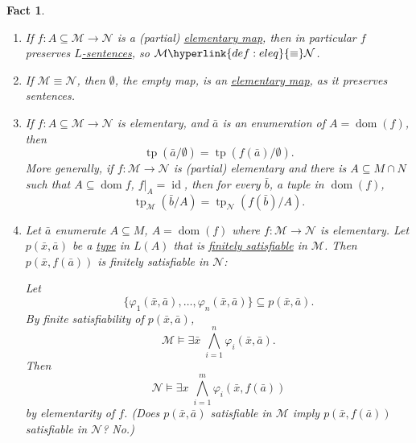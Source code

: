 \documentclass{article}
\let\models\vDash
\DeclareMathOperator{\dom}{dom}
\DeclareMathOperator{\tp}{tp}
\newtheorem{nfact}[nthm]{Fact}
\begin{document}
\begin{nfact}\label{fact:6.4}\leavevmode
  \begin{enumerate}[label=(\roman*)]
    \item If $f: A \subseteq \mathcal{M} \to \mathcal{N}$ is a (partial) \hyperlink{def:elmap}{elementary map}, then in particular $f$ preserves \hyperlink{def:sentence}{$L$-sentences}, so $\mathcal{M} \hyperlink{def:eleq}{\equiv} \mathcal{N}$.
    \item If $\mathcal{M} \equiv \mathcal{N}$, then $\emptyset$, the empty map, is an \hyperlink{def:el}{elementary map}, as it preserves sentences.
    \item If $f: A \subseteq \mathcal{M} \to \mathcal{N}$ is elementary, and $\bar{a}$ is an enumeration of $A = \dom(f)$, then
      \begin{equation*}
        \tp(\bar{a}/\emptyset) = \tp(f(\bar{a})/\emptyset).
      \end{equation*}
      More generally, if $f: \mathcal{M} \to \mathcal{N}$ is (partial) elementary and there is $A \subseteq M \cap N$ such that $A \subseteq \dom f$, $f|_A = \operatorname{id}$, then for every $\bar{b}$, a tuple in $\dom(f)$,
      \begin{equation*}
        \tp_\mathcal{M}(\bar{b}/A) = \tp_{\mathcal{N}}(f(\bar{b})/A).
      \end{equation*}
    \item Let $\bar{a}$ enumerate $A \subseteq M$, $A = \dom(f)$ where $f: \mathcal{M} \to \mathcal{N}$ is elementary.
      Let $p(\bar{x},\bar{a})$ be a \hyperlink{def:type}{type} in $L(A)$ that is \hyperlink{def:type}{finitely satisfiable} in $\mathcal{M}$.
      Then $p(\bar{x},f(\bar{a}))$ is finitely satisfiable in $\mathcal{N}$:

      Let
      \begin{equation*}\{\varphi_1(\bar{x},\bar{a}), \dotsc, \varphi_n(\bar{x},\bar{a})\} \subseteq p(\bar{x},\bar{a}).\end{equation*}
      By finite satisfiability of $p(\bar{x},\bar{a})$,
    \begin{equation*}\mathcal{M} \models \exists \bar{x} \; \bigwedge_{i=1}^n \varphi_i(\bar{x},\bar{a}).\end{equation*}
      Then
      \begin{equation*}\mathcal{N} \models \exists x \; \bigwedge_{i=1}^m \varphi_i(\bar{x},f(\bar{a}))\end{equation*}
      by elementarity of $f$.
      (Does $p(\bar{x},\bar{a})$ satisfiable in $\mathcal{M}$ imply $p(\bar{x},f(\bar{a}))$ satisfiable in $\mathcal{N}$? No.)
  \end{enumerate}
\end{nfact}
\end{document}
